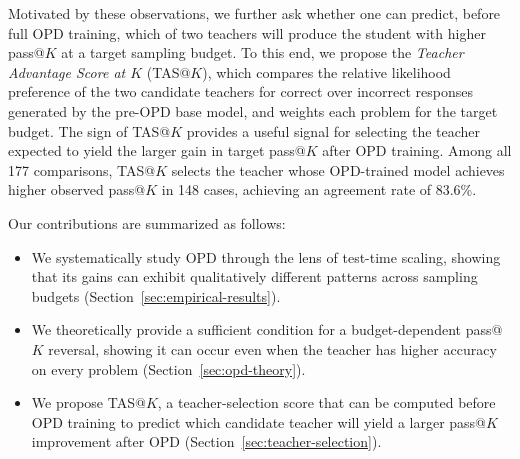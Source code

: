 \documentclass{article}
\theoremstyle{opdplain}
\begin{document}
\par
Motivated by these observations, we further ask whether one can predict, before full OPD training, which of two teachers will produce the student with higher pass@$K$ at a target sampling budget. To this end, we propose the \textit{Teacher Advantage Score at $K$} (TAS@$K$), which compares the relative likelihood preference of the two candidate teachers for correct over incorrect responses generated by the pre-OPD base model, and weights each problem for the target budget. The sign of TAS@$K$ provides a useful signal for selecting the teacher expected to yield the larger gain in target pass@$K$ after OPD training. Among all 177 comparisons, TAS@$K$ selects the teacher whose OPD-trained model achieves higher observed pass@$K$ in 148 cases, achieving an agreement rate of 83.6\%.

\par
Our contributions are summarized as follows:
\begin{itemize}[leftmargin=*,itemindent=0pt]
\item We systematically study OPD through the lens of test-time scaling, showing that its gains can exhibit qualitatively different patterns across sampling budgets (Section~\ref{sec:empirical-results}).
\item We theoretically provide a sufficient condition for a budget-dependent pass@$K$ reversal, showing it can occur even when the teacher has higher accuracy on every problem (Section~\ref{sec:opd-theory}).
\item We propose TAS@$K$, a teacher-selection score that can be computed before OPD training to predict which candidate teacher will yield a larger pass@$K$ improvement after OPD (Section~\ref{sec:teacher-selection}).
\end{itemize}
\end{document}
